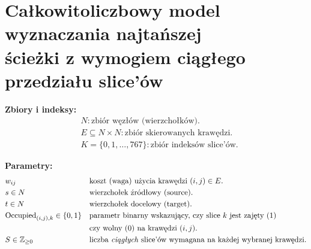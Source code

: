 \documentclass[12pt]{article}
\begin{document}
\section*{Całkowitoliczbowy model wyznaczania najtańszej \\ ścieżki z wymogiem ciągłego przedziału slice'ów}

\noindent \textbf{Zbiory i indeksy:}
\begin{align*}
	 & N: \text{zbiór węzłów (wierzchołków).}                              \\
	 & E \subseteq N \times N: \text{zbiór skierowanych krawędzi.} \\
	 & K = \{0,1,\dots,767\}: \text{zbiór indeksów slice'ów.}
\end{align*}

\vspace{1em}

\noindent \textbf{Parametry:}
\begin{align*}
	 & w_{ij}
	 &                                       & \text{koszt (waga) użycia krawędzi }(i,j)\in E.                                                                                    \\
	 & s \in N
	 &                                       & \text{wierzchołek źródłowy (source).}                                                                                              \\
	 & t \in N
	 &                                       & \text{wierzchołek docelowy (target).}                                                                                              \\
	 & \text{Occupied}_{(i,j),k} \in \{0,1\}
	 &                                       & \text{parametr binarny wskazujący, czy slice }k \text{ jest zajęty (}1\text{) }                                                  \\
	 &                                       &                                                                                   & \text{czy wolny (}0\text{) na krawędzi }(i,j). \\
	 & S \in \mathbb{Z}_{\ge 0}
	 &                                       & \text{liczba \emph{ciągłych} slice'ów wymagana na każdej wybranej krawędzi.}
\end{align*}

\vspace{1em}
\end{document}

